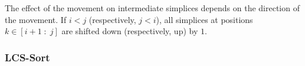 \documentclass[sn-mathphys]{sn-jnl}
\newtheorem{proposition}{Proposition}
\begin{document}
\noindent The effect of the movement on intermediate simplices depends on the direction of the movement. If $i < j$ (respectively, $j < i$), all simplices at positions $k \in [i+1\;:\;j] $ are shifted down (respectively, up) by $1$. 

\subsubsection{LCS-Sort}
\end{document}
